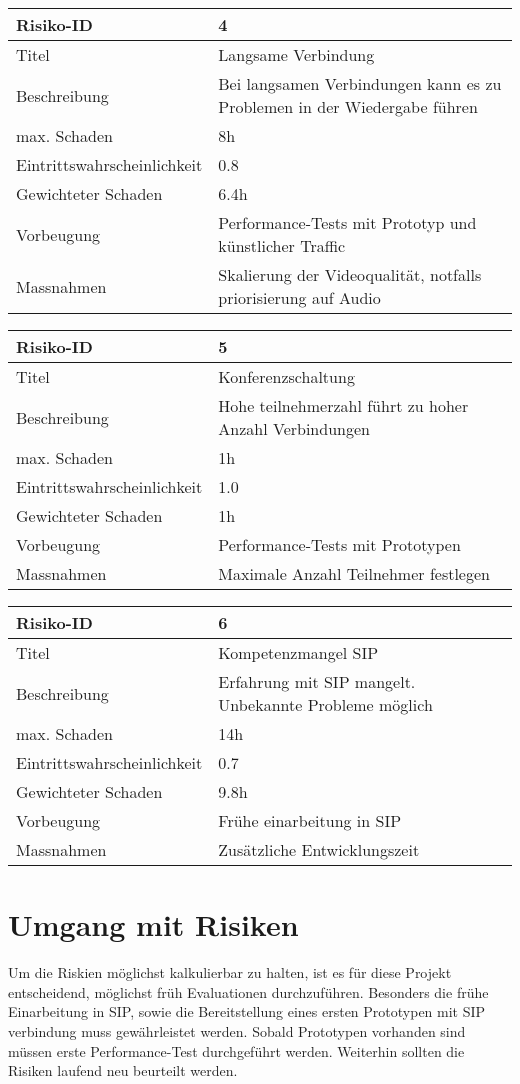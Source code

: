 \begin{table}[h!]
	\begin{tabular}{|p{} | p{} |}
	\hline	
	Risiko-ID & 4 \\
	\hline
	Titel & Langsame Verbindung \\
	Beschreibung & Bei langsamen Verbindungen kann es zu Problemen in der Wiedergabe führen \\
	max. Schaden	& 8h \\
	Eintrittswahrscheinlichkeit & 0.8 \\
	Gewichteter Schaden	& 6.4h \\
	Vorbeugung	& Performance-Tests mit Prototyp und künstlicher Traffic \\
	Massnahmen	& Skalierung der Videoqualität, notfalls priorisierung auf Audio \\
	\hline
	\end{tabular}
	
	\begin{tabular}{|p{} | p{} |}
	\hline	
	Risiko-ID & 5 \\
	\hline
	Titel & Konferenzschaltung \\
	Beschreibung & Hohe teilnehmerzahl führt zu hoher Anzahl Verbindungen \\
	max. Schaden	& 1h \\
	Eintrittswahrscheinlichkeit & 1.0 \\
	Gewichteter Schaden	& 1h \\
	Vorbeugung	& Performance-Tests mit Prototypen \\
	Massnahmen	& Maximale Anzahl Teilnehmer festlegen \\
	\hline
	\end{tabular}
	
	\begin{tabular}{|p{} | p{} |}
	\hline	
	Risiko-ID & 6 \\
	\hline
	Titel & Kompetenzmangel SIP \\
	Beschreibung & Erfahrung mit SIP mangelt. Unbekannte Probleme möglich \\
	max. Schaden	& 14h \\
	Eintrittswahrscheinlichkeit & 0.7 \\
	Gewichteter Schaden	& 9.8h \\
	Vorbeugung	& Frühe einarbeitung in SIP \\
	Massnahmen	& Zusätzliche Entwicklungszeit \\
	\hline
	\end{tabular}
\end{table}


\clearpage	

\section{Umgang mit Risiken}
\hline
Um die Riskien möglichst kalkulierbar zu halten, ist es für diese Projekt entscheidend, möglichst früh
Evaluationen durchzuführen. Besonders die frühe Einarbeitung in SIP, sowie die Bereitstellung eines ersten
Prototypen mit SIP verbindung muss gewährleistet werden. Sobald Prototypen vorhanden sind müssen erste
Performance-Test durchgeführt werden. Weiterhin sollten die Risiken laufend neu beurteilt werden.
